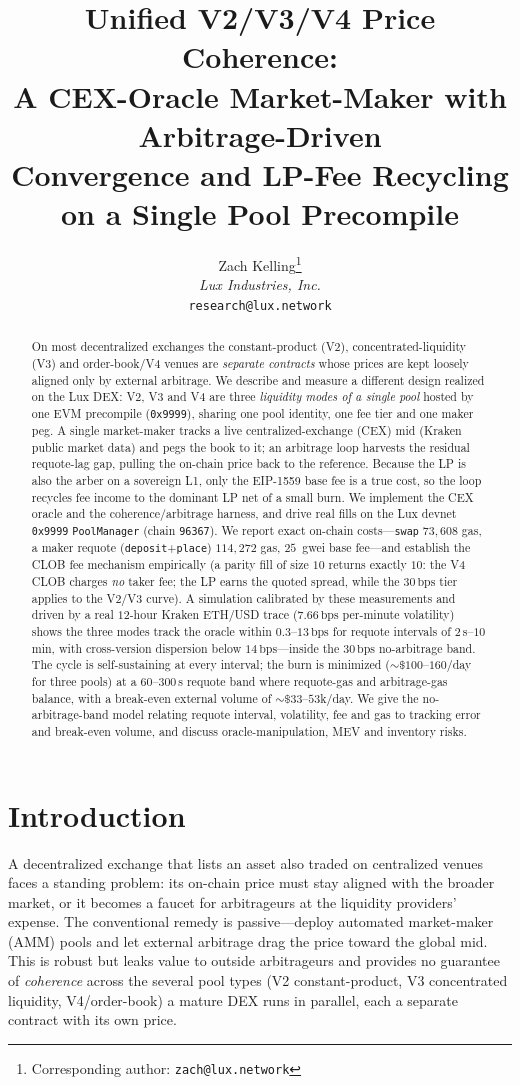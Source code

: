 \documentclass[11pt,a4paper]{article}
\title{Unified V2/V3/V4 Price Coherence:\\
A CEX-Oracle Market-Maker with Arbitrage-Driven\\
Convergence and LP-Fee Recycling on a Single Pool Precompile}
\author{
Zach Kelling\thanks{Corresponding author: \texttt{zach@lux.network}}\\
\textit{Lux Industries, Inc.}\\
\texttt{research@lux.network}
}
\date{}
\newcommand{\bps}{\,\text{bps}}
\begin{document}
\luxcoverpage

\begin{abstract}
On most decentralized exchanges the constant-product (V2), concentrated-liquidity
(V3) and order-book/V4 venues are \emph{separate contracts} whose prices are kept
loosely aligned only by external arbitrage. We describe and measure a different
design realized on the Lux DEX: V2, V3 and V4 are three \emph{liquidity modes of a
single pool} hosted by one EVM precompile (\texttt{0x9999}), sharing one pool
identity, one fee tier and one maker peg. A single market-maker tracks a live
centralized-exchange (CEX) mid (Kraken public market data) and pegs the book to it;
an arbitrage loop harvests the residual requote-lag gap, pulling the on-chain price
back to the reference. Because the LP is also the arber on a sovereign L1, only the
EIP-1559 base fee is a true cost, so the loop recycles fee income to the dominant LP
net of a small burn. We implement the CEX oracle and the coherence/arbitrage harness,
and drive real fills on the Lux devnet \texttt{0x9999} \texttt{PoolManager} (chain
\texttt{96367}). We report exact on-chain costs---\texttt{swap} $73{,}608$ gas,
a maker requote (\texttt{deposit}+\texttt{place}) $114{,}272$ gas, $25$~gwei base
fee---and establish the CLOB fee mechanism empirically (a parity fill of size $10$
returns exactly $10$: the V4 CLOB charges \emph{no} taker fee; the LP earns the quoted
spread, while the $30\bps$ tier applies to the V2/V3 curve). A simulation calibrated by
these measurements and driven by a real $12$-hour Kraken ETH/USD trace
($7.66\bps$ per-minute volatility) shows the three modes track the oracle within
$0.3$--$13\bps$ for requote intervals of $2$\,s--$10$\,min, with cross-version
dispersion below $14\bps$---inside the $30\bps$ no-arbitrage band. The cycle is
self-sustaining at every interval; the burn is minimized ($\sim\!\$100$--$160$/day for
three pools) at a $60$--$300$\,s requote band where requote-gas and arbitrage-gas
balance, with a break-even external volume of $\sim\!\$33$--$53$k/day. We give the
no-arbitrage-band model relating requote interval, volatility, fee and gas to tracking
error and break-even volume, and discuss oracle-manipulation, MEV and inventory risks.
\end{abstract}

\section{Introduction}

A decentralized exchange that lists an asset also traded on centralized venues faces a
standing problem: its on-chain price must stay aligned with the broader market, or it
becomes a faucet for arbitrageurs at the liquidity providers' expense. The
conventional remedy is passive---deploy automated market-maker (AMM) pools and let
external arbitrage drag the price toward the global mid. This is robust but leaks value
to outside arbitrageurs and provides no guarantee of \emph{coherence} across the
several pool types (V2 constant-product, V3 concentrated liquidity, V4/order-book) a
mature DEX runs in parallel, each a separate contract with its own price.
\end{document}
